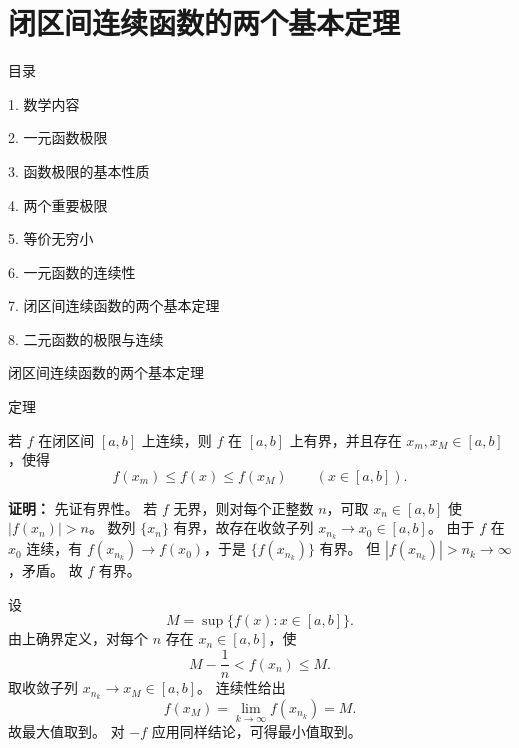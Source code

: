 \documentclass[aspectratio=169,10pt,fontset=fandol]{ctexbeamer}
\begin{document}
\section{闭区间连续函数的两个基本定理}
\begin{frame}[t,fragile]{目录}
\normalsize
{\color{black}\normalsize 1. 数学内容\par}\vspace{0.3em}
{\color{black}\normalsize 2. 一元函数极限\par}\vspace{0.3em}
{\color{black}\normalsize 3. 函数极限的基本性质\par}\vspace{0.3em}
{\color{black}\normalsize 4. 两个重要极限\par}\vspace{0.3em}
{\color{black}\normalsize 5. 等价无穷小\par}\vspace{0.3em}
{\color{black}\normalsize 6. 一元函数的连续性\par}\vspace{0.3em}
{\color{blue}\normalsize 7. 闭区间连续函数的两个基本定理\par}\vspace{0.3em}
{\color{gray!40}\normalsize 8. 二元函数的极限与连续\par}\vspace{0.3em}
\end{frame}
\begin{frame}[t,fragile]{闭区间连续函数的两个基本定理}
\normalsize
\begin{block}{定理}
{\normalsize

若 $f$ 在闭区间 $[a,b]$ 上连续，则 $f$ 在 $[a,b]$ 上有界，并且存在 $x_m,x_M\in[a,b]$，使得
\[
f(x_m)\le f(x)\le f(x_M)\qquad (x\in[a,b]).
\]

}
\end{block}
\pause
{\normalsize
\textbf{证明：}
先证有界性。 若 $f$ 无界，则对每个正整数 $n$，可取 $x_n\in[a,b]$ 使 $|f(x_n)|>n$。 数列 $\{x_n\}$ 有界，故存在收敛子列 $x_{n_k}\to x_0\in[a,b]$。 由于 $f$ 在 $x_0$ 连续，有 $f(x_{n_k})\to f(x_0)$，于是 $\{f(x_{n_k})\}$ 有界。 但 $|f(x_{n_k})|>n_k\to\infty$，矛盾。 故 $f$ 有界。

设
\[
M=\sup\{f(x):x\in[a,b]\}.
\]
由上确界定义，对每个 $n$ 存在 $x_n\in[a,b]$，使
\[
M-\frac1n<f(x_n)\le M.
\]
取收敛子列 $x_{n_k}\to x_M\in[a,b]$。 连续性给出
\[
f(x_M)=\lim_{k\to\infty}f(x_{n_k})=M.
\]
故最大值取到。 对 $-f$ 应用同样结论，可得最小值取到。

}
\end{frame}
\end{document}
